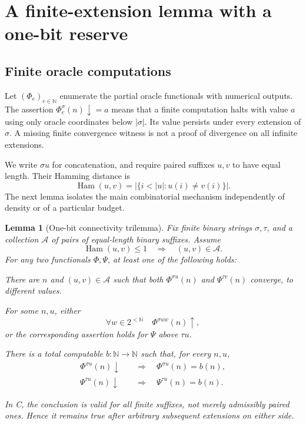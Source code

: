 \documentclass[11pt,a4paper]{article}
\newcommand{\N}{\mathbb N}
\newcommand{\strings}{2^{<\N}}
\newcommand{\Ham}{\operatorname{Ham}}
\newtheorem{lemma}[theorem]{Lemma}
\theoremstyle{definition}\newtheorem{definition}[theorem]{Definition}
\theoremstyle{remark}\newtheorem{remark}[theorem]{Remark}
\begin{document}
\section{A finite-extension lemma with a one-bit reserve}
\label{sec:extension}

\subsection{Finite oracle computations}
Let $(\Phi_e)_{e\in\N}$ enumerate the partial oracle functionals with numerical
outputs. The assertion $\Phi_e^\sigma(n)\downarrow=a$ means that a finite
computation halts with value $a$ using only oracle coordinates below
$|\sigma|$. Its value persists under every extension of $\sigma$.
A missing finite convergence witness is not a proof of divergence on all
infinite extensions.

We write $\sigma u$ for concatenation, and require paired suffixes $u,v$ to
have equal length. Their Hamming distance is
\[
          \Ham(u,v)=|\{i<|u|:u(i)\ne v(i)\}|.
\]
The next lemma isolates the main combinatorial mechanism independently of
density or of a particular budget.

\begin{lemma}[One-bit connectivity trilemma]\label{lem:trilemma}
Fix finite binary strings $\sigma,\tau$, and a collection $\mathcal A$ of pairs
of equal-length binary suffixes. Assume
\begin{equation}\label{eq:one-bit}
             \Ham(u,v)\le1\quad\Longrightarrow\quad(u,v)\in\mathcal A.
\end{equation}
For any two functionals $\Phi,\Psi$, at least one of the following holds:
\begin{description}[style=nextline]
\item[D: admissible disagreement.]
There are $n$ and $(u,v)\in\mathcal A$ such that both
$\Phi^{\sigma u}(n)$ and $\Psi^{\tau v}(n)$ converge, to different values.
\item[P: a partiality cylinder.]
For some $n,u$, either
\begin{equation}\label{eq:partial-cylinder}
        \forall w\in\strings\quad\Phi^{\sigma u w}(n)\uparrow,
\end{equation}
or the corresponding assertion holds for $\Psi$ above $\tau u$.
\item[C: a computable common output.]
There is a total computable $b:\N\to\N$ such that, for every $n,u$,
\begin{align*}
 \Phi^{\sigma u}(n)\downarrow&\quad\Longrightarrow\quad
      \Phi^{\sigma u}(n)=b(n),\\
 \Psi^{\tau u}(n)\downarrow&\quad\Longrightarrow\quad
      \Psi^{\tau u}(n)=b(n).
\end{align*}
\end{description}
In C, the conclusion is valid for \emph{all} finite suffixes, not merely
admissibly paired ones. Hence it remains true after arbitrary subsequent
extensions on either side.
\end{lemma}
\end{document}
